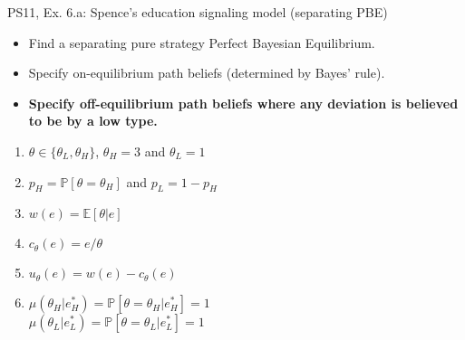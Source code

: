 \begin{frame}{PS11, Ex. 6.a: Spence’s education signaling model (separating PBE)}
    \begin{itemize}
      \item[(a)] Find a separating pure strategy Perfect Bayesian Equilibrium.
    \end{itemize}\vspace{-8pt}
    \begin{multicols}{2}
      \begin{itemize}
        \item[Step 1:] Specify on-equilibrium path beliefs (determined by Bayes' rule).
        \item[Step 2:] \textbf{Specify off-equilibrium path beliefs where any deviation is believed to be by a low type.}
      \end{itemize}
      \vfill\null\columnbreak
      \begin{enumerate}
        \item[Types:] $\theta\in\{\theta_L,\theta_H\}$, $\theta_H=3$ and $\theta_L=1$
        \item[Prob.:] $p_H=\mathbb{P}[\theta=\theta_H]$ and $p_L=1-p_H$
        \item[Wage:] $w(e)=\mathbb{E}[\theta|e]$
        \item[Cost:] $c_\theta(e)=e/\theta$
        \item[Utility:] $u_\theta(e)=w(e)-c_\theta(e)$
        \item $\mu\left(\theta_H|e_H^*\right)=
               \mathbb{P}\left[\theta=\theta_H|e_H^*\right]=1$\\
              $\mu\left(\theta_L|e_L^*\right)=
               \mathbb{P}\left[\theta=\theta_L|e_L^*\right]=1$
      \end{enumerate}
      \vfill\null
    \end{multicols}
\end{frame}
